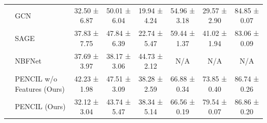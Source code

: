 \documentclass{article}
\theoremstyle{plain}
\theoremstyle{definition}
\theoremstyle{remark}
\begin{document}
\begin{table}[t]
{\begin{tabular}{@{}clcccccc@{}}
             & GCN                        & 32.50 ± 6.87                        & 50.01 ± 6.04                        & 19.94 ± 4.24                        & 54.96 ± 3.18                        & 29.57 ± 2.90                        & 84.85 ± 0.07                        \\
             & SAGE                       & {\color{thirdbest} 37.83 ± 7.75}    & 47.84 ± 6.39                        & 22.74 ± 5.47                        & 59.44 ± 1.37                        & 41.02 ± 1.94                        & 83.06 ± 0.09                        \\
             & NBFNet                     & 37.69 ± 3.97                        & 38.17 ± 3.06                        & {\color{firstbest} 44.73 ± 2.12}    & N/A                                 & N/A                                 & N/A                                 \\
             & PENCIL w/o Features (Ours) & {\color{firstbest} 42.23 ± 1.98}    & 47.51 ± 3.09                        & 38.28 ± 2.59                        & {\color{thirdbest} 66.88 ± 0.34}    & {\color{thirdbest} 73.85 ± 0.40}    & 86.74 ± 0.26                        \\
             & PENCIL (Ours)             & 32.12 ± 3.04                        & 43.74 ± 5.47                        & {\color{thirdbest} 38.34 ± 5.14}    & 66.56 ± 0.19                        & {\color{firstbest} 79.54 ± 0.07}    & 86.86 ± 0.20                        \\ \bottomrule
    \end{tabular}%
    }
\end{table}
\end{document}
